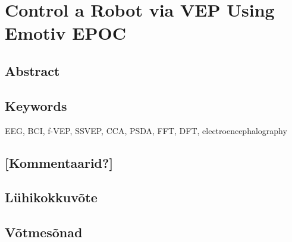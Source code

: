 
\chapter*{Control a Robot via VEP Using Emotiv EPOC}
\section*{Abstract}
\section*{Keywords}
\normalsize{EEG, BCI, f-VEP, SSVEP, CCA, PSDA, FFT, DFT, electroencephalography}
\section*{[Kommentaarid?]}
\section*{Lühikokkuvõte}
\section*{Võtmesõnad}